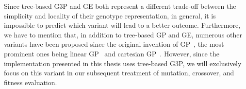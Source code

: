 Since tree-based G3P and GE both represent a different trade-off between the simplicity and locality of their genotype representation, in general, it is impossible to predict which variant will lead to a better outcome.
Furthermore, we have to mention that, in addition to tree-based GP and GE, numerous other variants have been proposed since the original invention of GP~\cite{poli2008field}, the most prominent ones being linear GP~\cite{brameier2007linear} and cartesian GP~\cite{miller2008cartesian}. 
However, since the implementation presented in this thesis uses tree-based G3P, we will exclusively focus on this variant in our subsequent treatment of mutation, crossover, and fitness evaluation.
